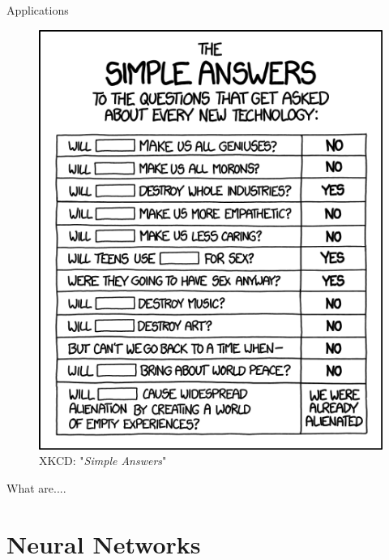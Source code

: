 \documentclass{beamer}
\begin{document}
\begin{frame}{Applications}
	\begin{multicols}{2}
		\begin{figure}
			\includegraphics[width=.4\textwidth]{../Images/xkcd_simple_answers.png}
			\caption{XKCD: "\textit{Simple Answers}" \cite{xkcd-simple-answers}}
		\end{figure}
		
		\columnbreak
		
		\null \vfill
		
		What are....

		
		\vfill \null
	\end{multicols}
\end{frame}

\section{Neural Networks}
\end{document}
